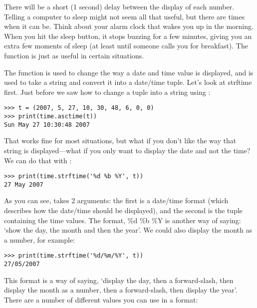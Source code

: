 \noindent
There will be a short (1 second) delay between the display of each number. Telling a computer to sleep might not seem all that useful, but there are times when it can be.  Think about your alarm clock that wakes you up in the morning.  When you hit the sleep button, it stops buzzing for a few minutes, giving you an extra few moments of sleep (at least until someone calls you for breakfast).  The  function is just as useful in certain situations.

The function  is used to change the way a date and time value is displayed, and  is used to take a string and convert it into a date/time tuple. Let's look at strftime first.  Just before we saw how to change a tuple into a string using :

\begin{Verbatim}[frame=single]
>>> t = (2007, 5, 27, 10, 30, 48, 6, 0, 0)
>>> print(time.asctime(t))
Sun May 27 10:30:48 2007
\end{Verbatim}

\noindent
That works fine for most situations, but what if you don't like the way that string is displayed---what if you only want to display the date and not the time?  We can do that with :

\begin{Verbatim}[frame=single]
>>> print(time.strftime('%d %b %Y', t))
27 May 2007
\end{Verbatim}

As you can see,  takes 2 arguments:  the first is a date/time format (which describes how the date/time should be displayed), and the second is the tuple containing the time values.  The format, \%d \%b \%Y is another way of saying: `show the day, the month and then the year'.  We could also display the month as a number, for example:

\begin{Verbatim}[frame=single]
>>> print(time.strftime('%d/%m/%Y', t))
27/05/2007
\end{Verbatim}

This format is a way of saying, `display the day, then a forward-slash, then display the month as a number, then a forward-slash, then display the year'.  There are a number of different values you can use in a format:

